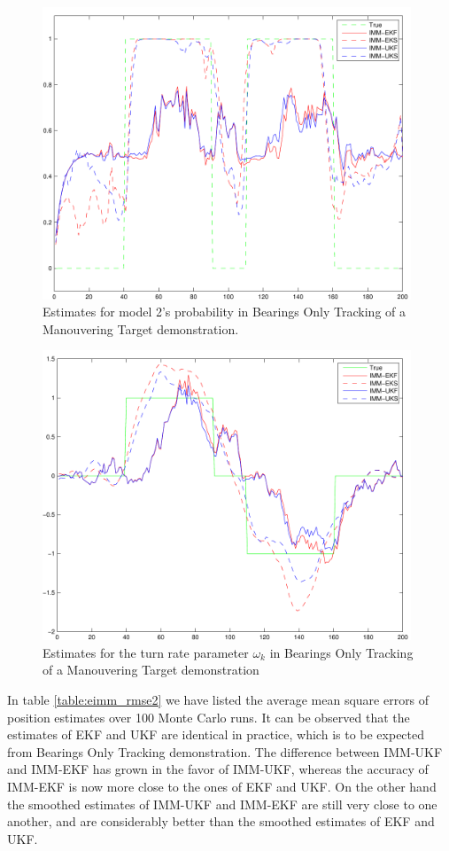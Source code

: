 \begin{figure}
\begin{center}
\includegraphics[width=11cm]{pics/eimm2_2}
\caption{ Estimates for model 2's probability in Bearings Only
Tracking of a Manouvering Target demonstration.  }
\label{fig:eimm2_2}
\end{center}
\end{figure}

\begin{figure}
\begin{center}
\includegraphics[width=11cm]{pics/eimm2_3}
\caption{ Estimates for the turn rate parameter $\omega_k$ in Bearings
Only Tracking of a Manouvering Target demonstration }
\label{fig:eimm2_3}
\end{center}
\end{figure}

In table \ref{table:eimm_rmse2} we have listed the average mean square
errors of position estimates over 100 Monte Carlo runs.  It can be
observed that the estimates of EKF and UKF are identical in practice,
which is to be expected from Bearings Only Tracking demonstration. The
difference between IMM-UKF and IMM-EKF has grown in the favor of
IMM-UKF, whereas the accuracy of IMM-EKF is now more close to the ones
of EKF and UKF. On the other hand the smoothed estimates of IMM-UKF
and IMM-EKF are still very close to one another, and are considerably
better than the smoothed estimates of EKF and UKF.

